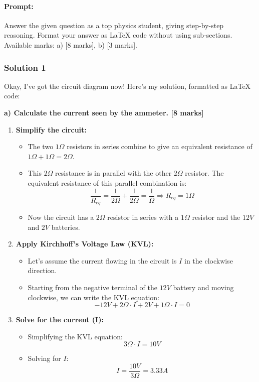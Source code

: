 \documentclass{article}
\begin{document}
\paragraph{Prompt: \\} 
Answer the given question as a top physics student, giving step-by-step reasoning. Format your answer as LaTeX code without using sub-sections. Available marks: a) [8 marks], b) [3 marks].

\subsubsection{Solution 1}
Okay, I've got the circuit diagram now! Here's my solution, formatted as LaTeX code:

\textbf{a) Calculate the current seen by the ammeter. [8 marks]}

\begin{enumerate}
\item \textbf{Simplify the circuit:} 
    \begin{itemize}
    \item The two $1 \Omega$ resistors in series combine to give an equivalent resistance of $1\Omega + 1\Omega = 2\Omega$.
    \item This $2\Omega$ resistance is in parallel with the other $2\Omega$ resistor. The equivalent resistance of this parallel combination is: 
    \[\frac{1}{R_{eq}} = \frac{1}{2\Omega} + \frac{1}{2\Omega} = \frac{1}{\Omega} \Rightarrow R_{eq} = 1\Omega\]
    \item Now the circuit has a $2\Omega$ resistor in series with a $1\Omega$ resistor and the $12V$ and $2V$ batteries.
    \end{itemize}

\item \textbf{Apply Kirchhoff's Voltage Law (KVL):}
    \begin{itemize}
    \item  Let's assume the current flowing in the circuit is $I$ in the clockwise direction. 
    \item  Starting from the negative terminal of the $12V$ battery and moving clockwise, we can write the KVL equation:
    \[-12V + 2\Omega \cdot I + 2V + 1\Omega \cdot I = 0\]
    \end{itemize}

\item \textbf{Solve for the current (I):}
    \begin{itemize}
    \item Simplifying the KVL equation:
    \[3\Omega \cdot I = 10V\]
    \item Solving for $I$:
    \[I = \frac{10V}{3\Omega} = 3.33A\]
    \end{itemize}
\end{enumerate}
\end{document}
